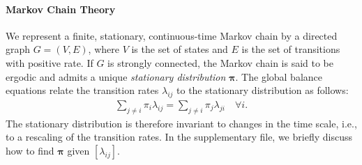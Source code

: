 \paragraph{Markov Chain Theory}
We represent a finite, stationary, continuous-time Markov chain by a directed graph $G = (V, E)$, where $V$ is the set of states and $E$ is the set of transitions with positive rate.
If $G$ is strongly connected, the Markov chain is said to be ergodic and admits a unique \emph{stationary distribution} $\bm{\pi}$.
The global balance equations relate the transition rates $\lambda_{ij}$ to the stationary distribution as follows:
\begin{align}
\label{fi:eq:balance}
\sum_{j \ne i} \pi_i \lambda_{ij} = \sum_{j \ne i} \pi_j \lambda_{ji} \quad \forall i.
\end{align}
The stationary distribution is therefore invariant to changes in the time scale, i.e., to a rescaling of the transition rates.
In the supplementary file, we briefly discuss how to find $\bm{\pi}$ given $[\lambda_{ij}]$.
